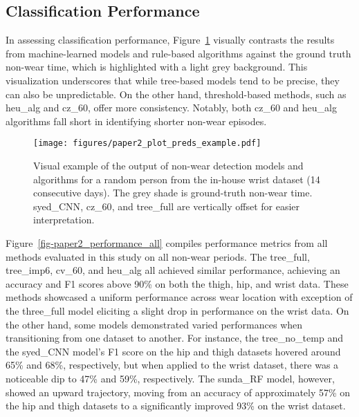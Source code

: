 \documentclass[
  10pt,
]{scrbook}
\begin{document}
\hypertarget{classification-performance}{%
\subsection{Classification
Performance}\label{classification-performance}}

In assessing classification performance,
Figure~\ref{fig-paper2_preds_ex} visually contrasts the results from
machine-learned models and rule-based algorithms against the ground
truth non-wear time, which is highlighted with a light grey background.
This visualization underscores that while tree-based models tend to be
precise, they can also be unpredictable. On the other hand,
threshold-based methods, such as \textsf{heu\_alg} and \textsf{cz\_60},
offer more consistency. Notably, both \textsf{cz\_60} and
\textsf{heu\_alg} algorithms fall short in identifying shorter non-wear
episodes.

\begin{figure}

{\centering \texttt{[image: figures/paper2\_plot\_preds\_example.pdf]}

}

\caption{\label{fig-paper2_preds_ex}Visual example of the output of
non-wear detection models and algorithms for a random person from the
in-house wrist dataset (14 consecutive days). The grey shade is
ground-truth non-wear time. \textsf{syed\_CNN}, \textsf{cz\_60}, and
\textsf{tree\_full} are vertically offset for easier interpretation.}

\end{figure}

Figure~\ref{fig-paper2_performance_all} compiles performance metrics
from all methods evaluated in this study on all non-wear periods. The
\textsf{tree\_full}, \textsf{tree\_imp6}, cv\_60, and \textsf{heu\_alg}
all achieved similar performance, achieving an accuracy and F1 scores
above 90\% on both the thigh, hip, and wrist data. These methods
showcased a uniform performance across wear location with exception of
the three\_full model eliciting a slight drop in performance on the
wrist data. On the other hand, some models demonstrated varied
performances when transitioning from one dataset to another. For
instance, the \textsf{tree\_no\_temp} and the \textsf{syed\_CNN} model's
F1 score on the hip and thigh datasets hovered around 65\% and 68\%,
respectively, but when applied to the wrist dataset, there was a
noticeable dip to 47\% and 59\%, respectively. The \textsf{sunda\_RF}
model, however, showed an upward trajectory, moving from an accuracy of
approximately 57\% on the hip and thigh datasets to a significantly
improved 93\% on the wrist dataset.
\end{document}
